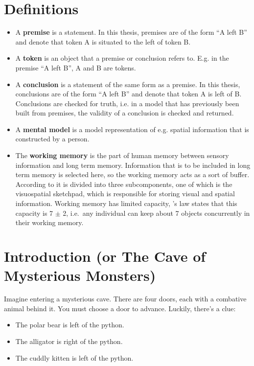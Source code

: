 \documentclass[hidelinks]{scrartcl}
\begin{document}
\section{Definitions}
\begin{itemize}
	\item A \textbf{premise} is a statement. In this thesis, premises are of the form ``A left B'' and denote that token A is situated to the left of token B.
	\item A \textbf{token} is an object that a premise or conclusion refers to. E.g. in the premise ``A left B'', A and B are tokens.
	\item A \textbf{conclusion} is a statement of the same form as a premise. In this thesis, conclusions are of the form ``A left B'' and denote that token A is left of B. Conclusions are checked for truth, i.e. in a model that has previously been built from premises, the validity of a conclusion is checked and returned.
	\item A \textbf{mental model} is a model representation of e.g. spatial information that is constructed by a person.
	\item The \textbf{working memory} is the part of human memory between sensory information and long term memory. Information 	that is to be included in long term memory is selected here, so the working memory acts as a sort of 			buffer. According to \cite{Baddeley.2007} it is divided into three subcomponents, one of which is the 		visuospatial sketchpad, which is responsible for storing visual and spatial information. Working 			memory has limited capacity, \cite{Miller.1956}'s law states that this capacity is 7 $\pm$ 2, i.e.\ any 		individual can keep about 7 objects concurrently in their working memory.
\end{itemize}
\newpage

\section{Introduction (or The Cave of Mysterious Monsters)}\label{sec:introduction}
Imagine entering a mysterious cave. There are four doors, each with a combative animal behind it. You must choose a door to advance. Luckily, there's a clue:
\begin{itemize}
\label{item:initial_problem}
\item The polar bear is left of the python.
\item The alligator is right of the python.
\item The cuddly kitten is left of the python.
\end{itemize}
\end{document}
